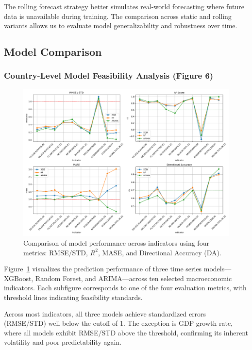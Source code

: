 \documentclass[12pt]{article}
\begin{document}
The rolling forecast strategy better simulates real-world forecasting where future data is unavailable during training. The comparison across static and rolling variants allows us to evaluate model generalizability and robustness over time.

\subsection{Model Comparison}
\subsubsection*{Country-Level Model Feasibility Analysis (Figure 6)}


\begin{figure}[H]
    \centering
    \includegraphics[width=\textwidth]{figure4.png}
    \caption{Comparison of model performance across indicators using four metrics: RMSE/STD, $R^2$, MASE, and Directional Accuracy (DA). }
    \label{fig:indicator_comparison}
\end{figure}

Figure~\ref{fig:indicator_comparison} visualizes the prediction performance of three time series models—XGBoost, Random Forest, and ARIMA—across ten selected macroeconomic indicators. Each subfigure corresponds to one of the four evaluation metrics, with threshold lines indicating feasibility standards.

Across most indicators, all three models achieve standardized errors (RMSE/STD) well below the cutoff of 1. The exception is GDP growth rate, where all models exhibit RMSE/STD above the threshold, confirming its inherent volatility and poor predictability again.
\end{document}

